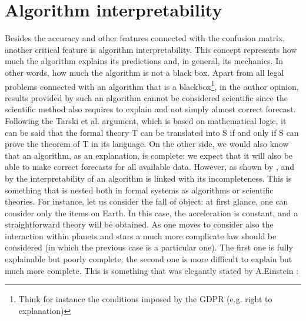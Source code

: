 \documentclass[12pt,%
               a4paper,%
               oneside,openany,%
               titlepage,%
               headinclude,footinclude,%
               BCOR5mm,%
               cleardoublepage=empty,%
               tablecaptionabove,%
               floatperchapter,
               ]{scrreprt}                 %
\begin{document}
\section{Algorithm interpretability}

Besides the accuracy and other features connected with the confusion matrix, another critical feature is algorithm interpretability. This concept represents how much the algorithm explains its predictions and, in general, its mechanics. In other words, how much the algorithm is not a black box. Apart from all legal problems connected with an algorithm that is a blackbox\footnote{Think for instance the conditions imposed by the GDPR (e.g. right to explanation)}, in the author opinion, results provided by such an algorithm cannot be considered scientific since the scientific method also requires to explain and not simply almost correct forecast. Following the Tarski et al. \cite{tarski1953undecidable} argument, which is based on mathematical logic, it can be said that the formal theory T can be translated into S if and only if S can prove the theorem of T in its language. On the other side, we would also know that an algorithm, as an explanation, is complete: we expect that it will also be able to make correct forecasts for all available data. However, as shown by \cite{doshi2017towards}, and by \cite{gilpin2018explaining} the interpretability of an algorithm is linked with its incompleteness. This is something that is nested both in formal systems as algorithms or scientific theories. For instance, let us consider the fall of object: at first glance, one can consider only the items on Earth. In this case, the acceleration is constant, and a straightforward theory will be obtained.  As one moves to consider also the interaction within planets and stars a much more complicate law should be considered (in which the previous case is a particular one). The first one is fully explainable but poorly complete; the second one is more difficult to explain but much more complete.  This is something that was elegantly stated by A.Einstein \cite{physics-reality}:
\end{document}
